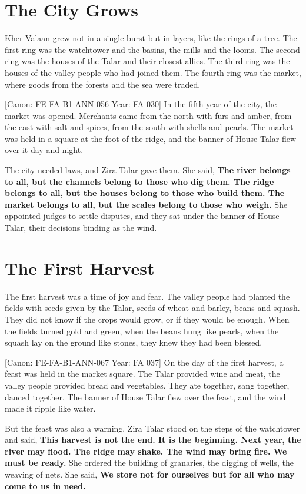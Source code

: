 \section{The City Grows}\label{the-city-grows}

Kher Valaan grew not in a single burst but in layers, like the rings of
a tree. The first ring was the watchtower and the basins, the mills and
the looms. The second ring was the houses of the Talar and their closest
allies. The third ring was the houses of the valley people who had
joined them. The fourth ring was the market, where goods from the
forests and the sea were traded.

{[}Canon: FE-FA-B1-ANN-056 \textbar{} Year: FA 030{]} In the fifth year
of the city, the market was opened. Merchants came from the north with
furs and amber, from the east with salt and spices, from the south with
shells and pearls. The market was held in a square at the foot of the
ridge, and the banner of House Talar flew over it day and night.

The city needed laws, and Zira Talar gave them. She said, \textbf{The
river belongs to all, but the channels belong to those who dig them. The
ridge belongs to all, but the houses belong to those who build them. The
market belongs to all, but the scales belong to those who weigh.} She
appointed judges to settle disputes, and they sat under the banner of
House Talar, their decisions binding as the wind.

\section{The First Harvest}\label{the-first-harvest}

The first harvest was a time of joy and fear. The valley people had
planted the fields with seeds given by the Talar, seeds of wheat and
barley, beans and squash. They did not know if the crops would grow, or
if they would be enough. When the fields turned gold and green, when the
beans hung like pearls, when the squash lay on the ground like stones,
they knew they had been blessed.

{[}Canon: FE-FA-B1-ANN-067 \textbar{} Year: FA 037{]} On the day of the
first harvest, a feast was held in the market square. The Talar provided
wine and meat, the valley people provided bread and vegetables. They ate
together, sang together, danced together. The banner of House Talar flew
over the feast, and the wind made it ripple like water.

But the feast was also a warning. Zira Talar stood on the steps of the
watchtower and said, \textbf{This harvest is not the end. It is the
beginning. Next year, the river may flood. The ridge may shake. The wind
may bring fire. We must be ready.} She ordered the building of
granaries, the digging of wells, the weaving of nets. She said,
\textbf{We store not for ourselves but for all who may come to us in
need.}

